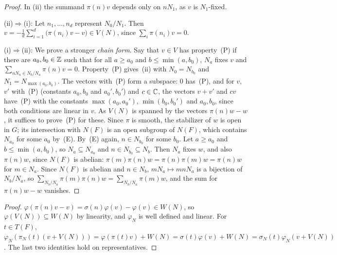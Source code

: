 \begin{lemma}
\end{lemma}
\begin{proof}
In (ii) the summand $\pi(n)v$ depends only on $nN_1$, as $v$ is $N_1$-fixed.

(ii)$\Rightarrow$(i): Let $n_1,\dots,n_d$ represent $N_0/N_1$. Then
$v=-\frac1d\sum_{i=1}^d\bigl(\pi(n_i)v-v\bigr)\in V(N)$, since $\sum_i\pi(n_i)v=0$.

(i)$\Rightarrow$(ii): We prove a stronger \emph{chain form}. Say that $v\in V$ has property~(P) if there are
$a_0,b_0\in\mathbb{Z}$ such that for all $a\ge a_0$ and $b\le\min(a,b_0)$, $N_a$ fixes $v$ and
$\sum_{nN_a\in N_b/N_a}\pi(n)v=0$. Property~(P) gives~(ii) with $N_0=N_{b_0}$ and $N_1=N_{\max(a_0,b_0)}$. The vectors
with~(P) form a subspace: $0$ has~(P), and for $v$, $v'$ with~(P) (constants $a_0,b_0$ and $a_0',b_0'$) and $c\in\mathbb{C}$,
the vectors $v+v'$ and $cv$ have~(P) with the constants $\max(a_0,a_0')$, $\min(b_0,b_0')$ and $a_0,b_0$, since both
conditions are linear in $v$. As $V(N)$ is spanned by the vectors $\pi(n)w-w$, it suffices to prove~(P) for these. Since
$\pi$ is smooth, the stabilizer of $w$ is open in $G$; its intersection with $N(F)$ is an open subgroup of $N(F)$, which
contains $N_{a_0}$ for some $a_0$ by~(E). By~(E) again, $n\in N_{b_0}$ for some $b_0$. Let $a\ge a_0$ and
$b\le\min(a,b_0)$, so $N_a\subseteq N_{a_0}$ and $n\in N_{b_0}\subseteq N_b$. Then $N_a$ fixes $w$, and also $\pi(n)w$,
since $N(F)$ is abelian: $\pi(m)\pi(n)w=\pi(n)\pi(m)w=\pi(n)w$ for $m\in N_a$. Since $N(F)$ is abelian and $n\in N_b$,
$mN_a\mapsto mnN_a$ is a bijection of $N_b/N_a$, so $\sum_{N_b/N_a}\pi(m)\pi(n)w=\sum_{N_b/N_a}\pi(m)w$, and the sum for
$\pi(n)w-w$ vanishes.
\end{proof}

\begin{theorem}
\end{theorem}
\begin{proof}
$\varphi(\pi(n)v-v)=\sigma(n)\varphi(v)-\varphi(v)\in W(N)$, so $\varphi(V(N))\subseteq W(N)$ by linearity, and
$\varphi_N$ is well defined and linear. For $t\in T(F)$,
$\varphi_N(\pi_N(t)(v+V(N)))=\varphi(\pi(t)v)+W(N)=\sigma(t)\varphi(v)+W(N)=\sigma_N(t)\varphi_N(v+V(N))$. The last two
identities hold on representatives.
\end{proof}

